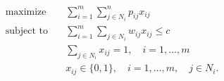 \begin{align*}
\text{maximize} \quad & \sum_{i=1}^m \sum_{j \in N_i}^n p_{ij} x_{ij} \\
\text{subject to} \quad & \sum_{i=1}^m \sum_{j \in N_i} w_{ij} x_{ij} \leq c \\
& \sum_{j \in N_i} x_{ij} = 1, \quad i = 1, \ldots, m \\
& x_{ij} \in \lbrace 0, 1 \rbrace, \quad i = 1, \ldots, m, \quad j \in N_i.
\end{align*}


